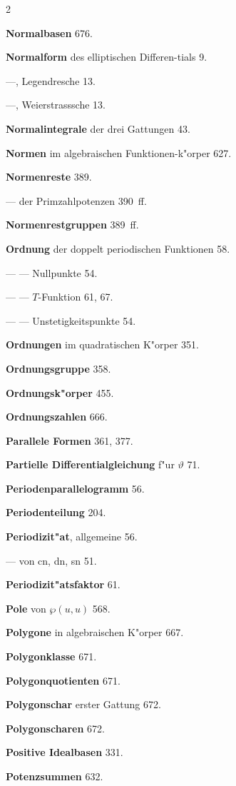 \documentclass[12pt,a4paper]{article}
\begin{document}
\begin{multicols}{2}
\bigskip

\textbf{Normalbasen} 676.

\textbf{Normalform} des elliptischen Differen{-}tials 9.

---, Legendresche 13.

---, Weierstrasssche 13.

\textbf{Normalintegrale} der drei Gattungen 43.

\textbf{Normen} im algebraischen Funktionen{-}k"orper 627.

\textbf{Normenreste} 389.

--- der Primzahlpotenzen 390~ff.

\textbf{Normenrestgruppen} 389~ff.

\bigskip

\textbf{Ordnung} der doppelt periodischen Funktionen 58.

--- --- Nullpunkte 54.

--- --- $T$-Funktion 61, 67.

--- --- Unstetigkeitspunkte 54.

\textbf{Ordnungen} im quadratischen K"orper 351.

\textbf{Ordnungsgruppe} 358.

\textbf{Ordnungsk"orper} 455.

\textbf{Ordnungszahlen} 666.

\bigskip

\textbf{Parallele Formen} 361, 377.

\textbf{Partielle Differentialgleichung} f"ur $\vartheta$ 71.

\textbf{Periodenparallelogramm} 56.

\textbf{Periodenteilung} 204.

\textbf{Periodizit"at}, allgemeine 56.

--- von cn, dn, sn 51.

\textbf{Periodizit"atsfaktor} 61.

\textbf{Pole} von $\wp(u,u)$ 568.

\textbf{Polygone} in algebraischen K"orper 667.

\textbf{Polygonklasse} 671.

\textbf{Polygonquotienten} 671.

\textbf{Polygonschar} erster Gattung 672.

\textbf{Polygonscharen} 672.

\textbf{Positive Idealbasen} 331.

\textbf{Potenzsummen} 632.


\end{multicols}
\end{document}
